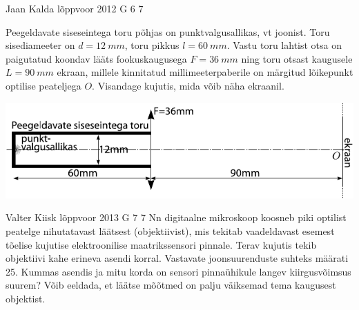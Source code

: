 \documentclass[11pt]{article}
\begin{document}
{{\begin{center}
\end{center}
\fi
}

{Jaan Kalda} %
{lõppvoor} %
{2012} %
{G 6} %
{7} %
{
\ifStatement
Peegeldavate siseseintega toru põhjas on punktvalgusallikas, vt joonist. Toru
sisediameeter on
$d=\SI{12}{mm}$, toru pikkus $l=\SI{60}{mm}$. Vastu toru lahtist otsa on
paigutatud koondav lääts fookuskaugusega $F=\SI{36}{mm}$ ning toru otsast
kaugusele $L=\SI{90}{mm}$ ekraan, millele kinnitatud millimeeterpaberile
on märgitud lõikepunkt optilise peateljega $O$.
Visandage kujutis, mida võib näha ekraanil.

\begin{center}
\includegraphics[width=\textwidth]{2012-v3g-06-toru-valgusallikas-lxxts}
\end{center}
\fi
}

{Valter Kiisk} %
{lõppvoor} %
{2013} %
{G 7} %
{7} %
{
\ifStatement
Nn digitaalne mikroskoop koosneb piki optilist peatelge nihutatavast
läätsest (objektiivist), mis tekitab vaadeldavast esemest tõelise kujutise
elektroonilise maatrikssensori pinnale. Terav kujutis tekib objektiivi kahe
erineva asendi korral. Vastavate joonsuurenduste suhteks määrati 25. Kummas
asendis ja mitu korda on sensori pinnaühikule langev kiirgusvõimsus suurem?
Võib eeldada, et läätse mõõtmed on palju väiksemad tema kaugusest objektist.
\fi
}
\newpage

}
\end{document}
